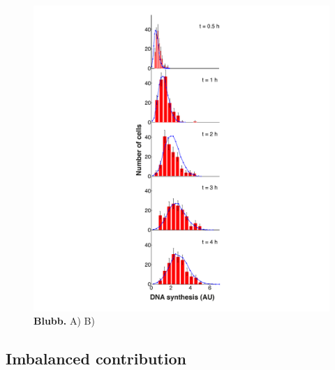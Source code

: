 \begin{figure}[htbp]
	\begin{center}
		\includegraphics[width=1\textwidth]{Abbildungen/figure3_7.pdf}
		\caption{\textbf{Blubb.} A) B) }
		\label{fig:ModelData_tempVar}
	\end{center}
\end{figure}
\subsection{Imbalanced contribution }


